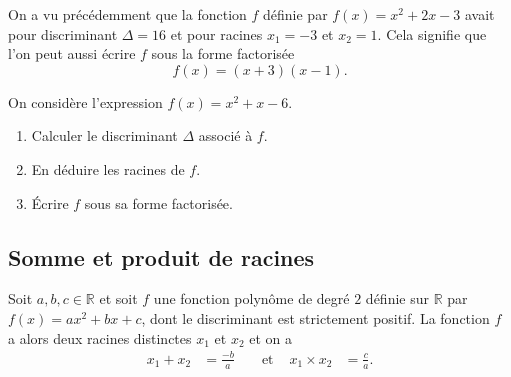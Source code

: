 \documentclass[11pt]{article}
\begin{document}
\begin{exemple}
  On a vu précédemment que la fonction $f$ définie par $f(x) = x^2+2x-3$
  avait pour discriminant $\Delta=16$ et pour racines $x_1=-3$ et $x_2=1$. Cela
  signifie que l'on peut aussi écrire $f$ sous la forme factorisée
  \[
    f(x) =(x+3)(x-1).
  \]
\end{exemple}
\begin{app}
  On considère l'expression $f(x)=x^2+x-6$.
  \begin{enumerate}
    \item Calculer le discriminant $\Delta$ associé à $f$.
    \item En déduire les racines de $f$.
    \item Écrire $f$ sous sa forme factorisée.
  \end{enumerate}
\end{app}

\subsection{Somme et produit de racines}
\begin{propadm}
  Soit $a,b,c\in\mathbb{R}$ et soit $f$ une fonction polynôme de degré $2$
  définie sur $\mathbb{R}$ par $f(x)=ax^2+bx+c$,
  dont le discriminant est strictement positif. La fonction $f$ a alors deux
  racines distinctes $x_1$ et $x_2$ et on a
  \begin{align*}
    x_1+x_2 &= \frac{-b}{a} &
    &\text{ et }&
    x_1\times x_2 &=\frac{c}{a}.
  \end{align*}
\end{propadm}
\end{document}
